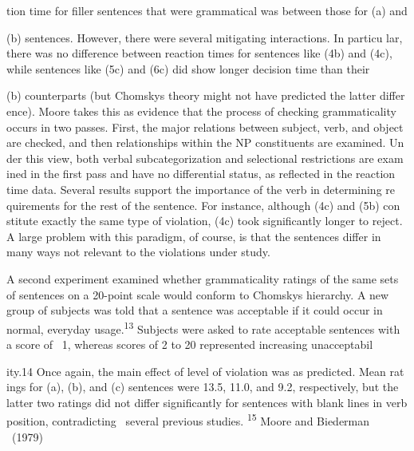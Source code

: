 \begin{styleStandard}
tion time for filler sentences that were grammatical was between those for (a) and
\end{styleStandard}


\begin{styleStandard}
(b) sentences. However, there were several mitigating interactions. In particu\- lar, there was no difference between reaction times for sentences like (4b) and (4c), while sentences like (5c) and (6c) did show longer decision time than their
\end{styleStandard}


\begin{styleStandard}
(b) counterparts (but Chomsky{\textquotesingle}s theory might not have predicted the latter differ\- ence). Moore takes this as evidence that the process of checking grammaticality occurs in two passes. First, the major relations between subject, verb, and object are checked, and then relationships within the NP constituents are examined. Un\- der this view, both verbal subcategorization and selectional restrictions are exam\- ined in the first pass and have no differential status, as reflected in the reaction time data. Several results support the importance of the verb in determining re\- quirements for the rest of the sentence. For instance, although (4c) and (5b) con\- stitute exactly the same type of violation, (4c) took significantly longer to reject. A large problem with this paradigm, of course, is that the sentences differ in many ways not relevant to the violations under study.
\end{styleStandard}


\begin{styleStandard}
A second experiment examined whether grammaticality ratings of the same sets of sentences on a 20-point scale would conform to Chomsky{\textquotesingle}s hierarchy. A new group of subjects was told that a sentence was {\textquotedbl}acceptable{\textquotedbl} if it {\textquotedbl}could occur in normal, everyday usage.{\textquotedbl}\textsuperscript{13}\textsuperscript{ }Subjects were asked to rate acceptable sentences with a score of \ 1, whereas scores of 2 to 20 represented increasing unacceptabil\-
\end{styleStandard}


\begin{styleStandard}
ity.14 Once again, the main effect of level of violation was as predicted. Mean rat\- ings for (a), (b), and (c) sentences were 13.5, 11.0, and 9.2, respectively, but the latter two ratings did not differ significantly for sentences with blank lines in verb position, contradicting \ several previous studies. \textsuperscript{15}\textsuperscript{ }Moore and Biederman \ (1979)
\end{styleStandard}


